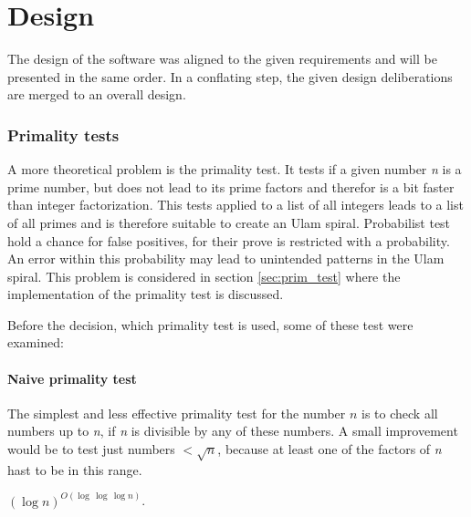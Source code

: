 \section{Design}
\label{sec:design}
The design of the software was aligned to the given requirements and will be presented in the same order. In a conflating step, the given design deliberations are merged to an overall design.



\subsubsection{Primality tests}
\label{sec:primality_test}
A more theoretical problem is the primality test. It tests if a given number \emph{n} is a prime number, but does not lead to its prime factors and therefor is a bit faster than integer factorization. This tests applied to a list of all integers leads to a list of all primes and is therefore suitable to create an Ulam spiral. Probabilist test hold a chance for false positives, for their prove is restricted with a probability. An error within this probability may lead to unintended patterns in the Ulam spiral. This problem is considered in section \ref{sec:prim_test} where the implementation of the primality test is discussed.

Before the decision, which primality test is used, some of these test were examined:

\paragraph{Naive primality test}
The simplest and less effective primality test for the number $n$ is to check all numbers up to \emph{n}, if \emph{n} is divisible by any of these numbers. A small improvement would be to  test just numbers $< \sqrt{n}$, because at least one of the factors of \emph{n} hast to be in this range.

    $(\log n)^{O(\log\,\log \,\log n)}$. 


